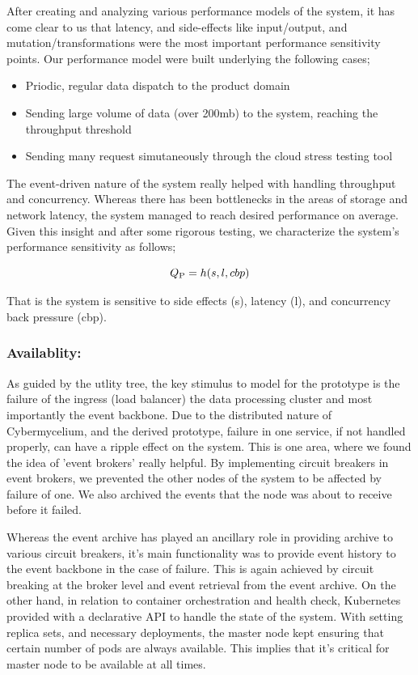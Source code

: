 \documentclass[review]{elsarticle}
\begin{document}
After creating and analyzing various performance models of the system, it has come clear to us that latency, and side-effects like input/output, and mutation/transformations were the most important performance sensitivity points. Our performance model were built underlying the following cases;

\begin{itemize}
    \item Priodic, regular data dispatch to the product domain
    \item Sending large volume of data (over 200mb) to the system, reaching the throughput threshold
    \item Sending many request simutaneously through the cloud stress testing tool
\end{itemize}

The event-driven nature of the system really helped with handling throughput and concurrency. Whereas there has been bottlenecks in the areas of storage and network latency, the system managed to reach desired performance on average. Given this insight and after some rigorous testing, we characterize the system's performance sensitivity as follows;

\begin{equation}
    Q\textsubscript{P} = h(s, l, cbp)
\end{equation}

That is the system is sensitive to side effects (s), latency (l), and concurrency back pressure (cbp).

\subsubsection{Availablity:}

As guided by the utlity tree, the key stimulus to model for the prototype is the failure of the ingress (load balancer)  the data processing cluster and most importantly the event backbone. Due to the distributed nature of Cybermycelium, and the derived prototype, failure in one service, if not handled properly, can have a ripple effect on the system. This is one area, where we found the idea of 'event brokers' really helpful. By implementing circuit breakers in event brokers, we prevented the other nodes of the system to be affected by failure of one. We also archived the events that the node was about to receive before it failed.

Whereas the event archive has played an ancillary role in providing archive to various circuit breakers, it's main functionality was to provide event history to the event backbone in the case of failure. This is again achieved by circuit breaking at the broker level and event retrieval from the event archive. On the other hand, in relation to container orchestration and health check, Kubernetes provided with a declarative API to handle the state of the system. With setting replica sets, and necessary deployments, the master node kept ensuring that certain number of pods are always available. This implies that it's critical for master node to be available at all times.
\end{document}
